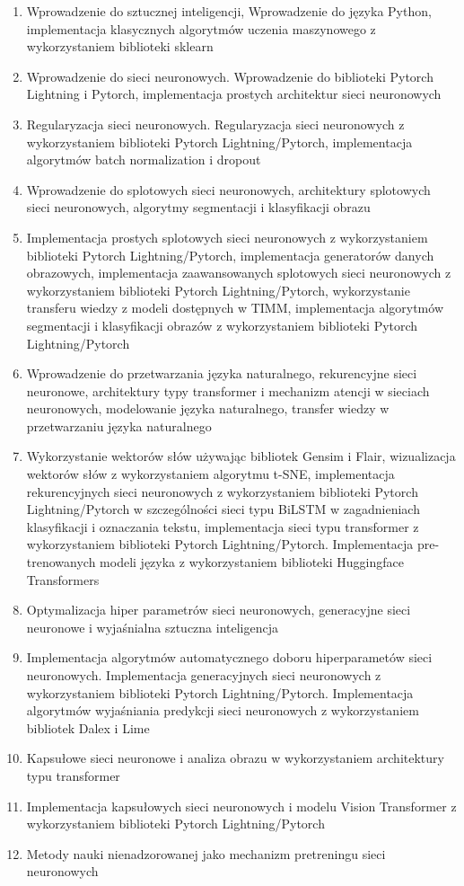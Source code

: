 \documentclass[12pt, a4paper]{article}
\begin{document}
\begin{enumerate}
  \item Wprowadzenie do sztucznej inteligencji, Wprowadzenie do języka Python, implementacja klasycznych algorytmów uczenia maszynowego z wykorzystaniem biblioteki sklearn
  \item Wprowadzenie do sieci neuronowych. Wprowadzenie do biblioteki Pytorch Lightning i Pytorch, implementacja prostych architektur sieci neuronowych
  \item Regularyzacja sieci neuronowych. Regularyzacja sieci neuronowych z wykorzystaniem biblioteki Pytorch Lightning/Pytorch, implementacja algorytmów batch normalization i dropout
  \item Wprowadzenie do splotowych sieci neuronowych, architektury splotowych sieci neuronowych, algorytmy segmentacji i klasyfikacji obrazu
  \item Implementacja prostych splotowych sieci neuronowych z wykorzystaniem biblioteki Pytorch Lightning/Pytorch, implementacja generatorów danych obrazowych, implementacja zaawansowanych splotowych sieci neuronowych z wykorzystaniem biblioteki Pytorch Lightning/Pytorch, wykorzystanie transferu wiedzy z modeli dostępnych w TIMM, implementacja algorytmów segmentacji i klasyfikacji obrazów z wykorzystaniem biblioteki Pytorch Lightning/Pytorch
  \item Wprowadzenie do przetwarzania języka naturalnego, rekurencyjne sieci neuronowe, architektury typy transformer i mechanizm atencji w sieciach neuronowych, modelowanie języka naturalnego, transfer wiedzy w przetwarzaniu języka naturalnego
  \item Wykorzystanie wektorów słów używając bibliotek Gensim i Flair, wizualizacja wektorów słów z wykorzystaniem algorytmu t-SNE, implementacja rekurencyjnych sieci neuronowych z wykorzystaniem biblioteki Pytorch Lightning/Pytorch w szczególności sieci typu BiLSTM w zagadnieniach klasyfikacji i oznaczania tekstu, implementacja sieci typu transformer z wykorzystaniem biblioteki Pytorch Lightning/Pytorch. Implementacja pre-trenowanych modeli języka z wykorzystaniem biblioteki Huggingface Transformers
  \item Optymalizacja hiper parametrów sieci neuronowych, generacyjne sieci neuronowe i wyjaśnialna sztuczna inteligencja
  \item Implementacja algorytmów automatycznego doboru hiperparametów sieci neuronowych. Implementacja generacyjnych sieci neuronowych z wykorzystaniem biblioteki Pytorch Lightning/Pytorch. Implementacja algorytmów wyjaśniania predykcji sieci neuronowych z wykorzystaniem bibliotek Dalex i Lime
  \item Kapsułowe sieci neuronowe i analiza obrazu w wykorzystaniem architektury typu transformer
  \item Implementacja kapsułowych sieci neuronowych i modelu Vision Transformer z wykorzystaniem biblioteki Pytorch Lightning/Pytorch
  \item Metody nauki nienadzorowanej jako mechanizm pretreningu sieci neuronowych
\end{enumerate}
\end{document}
